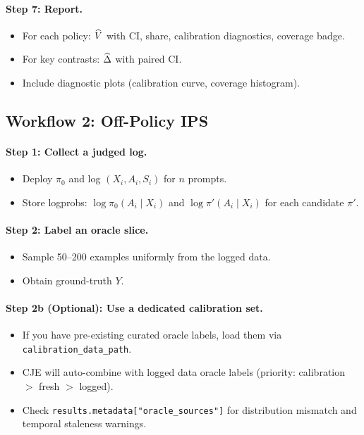 \paragraph{Step 7: Report.}
\begin{itemize}
\item For each policy: $\widehat{V}$ with CI, \oua{} share, calibration diagnostics, coverage badge.
\item For key contrasts: $\widehat{\Delta}$ with paired CI.
\item Include diagnostic plots (calibration curve, coverage histogram).
\end{itemize}

\subsection{Workflow 2: Off-Policy IPS}

\paragraph{Step 1: Collect a judged log.}
\begin{itemize}
\item Deploy $\pi_0$ and log $(X_i, A_i, S_i)$ for $n$ prompts.
\item Store logprobs: $\log \pi_0(A_i \mid X_i)$ and $\log \pi'(A_i \mid X_i)$ for each candidate $\pi'$.
\end{itemize}

\paragraph{Step 2: Label an oracle slice.}
\begin{itemize}
\item Sample 50--200 examples uniformly from the logged data.
\item Obtain ground-truth $Y$.
\end{itemize}

\paragraph{Step 2b (Optional): Use a dedicated calibration set.}
\begin{itemize}
\item If you have pre-existing curated oracle labels, load them via \texttt{calibration\_data\_path}.
\item CJE will auto-combine with logged data oracle labels (priority: calibration $>$ fresh $>$ logged).
\item Check \texttt{results.metadata["oracle\_sources"]} for distribution mismatch and temporal staleness warnings.
\end{itemize}


